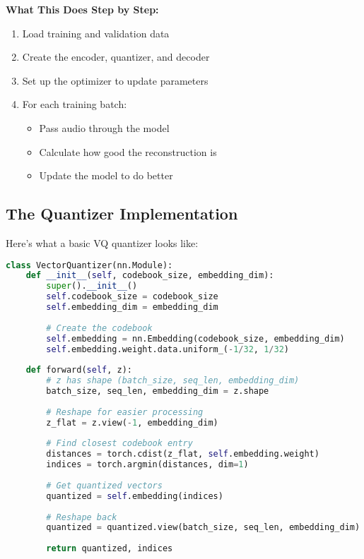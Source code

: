 \documentclass[12pt]{article}
\begin{document}
\textbf{What This Does Step by Step:}
\begin{enumerate}
    \item Load training and validation data
    \item Create the encoder, quantizer, and decoder
    \item Set up the optimizer to update parameters
    \item For each training batch:
    \begin{itemize}
        \item Pass audio through the model
        \item Calculate how good the reconstruction is
        \item Update the model to do better
    \end{itemize}
\end{enumerate}

\subsection{The Quantizer Implementation}

Here's what a basic VQ quantizer looks like:

\begin{lstlisting}[language=Python, basicstyle=\small]
class VectorQuantizer(nn.Module):
    def __init__(self, codebook_size, embedding_dim):
        super().__init__()
        self.codebook_size = codebook_size
        self.embedding_dim = embedding_dim
        
        # Create the codebook
        self.embedding = nn.Embedding(codebook_size, embedding_dim)
        self.embedding.weight.data.uniform_(-1/32, 1/32)
    
    def forward(self, z):
        # z has shape (batch_size, seq_len, embedding_dim)
        batch_size, seq_len, embedding_dim = z.shape
        
        # Reshape for easier processing
        z_flat = z.view(-1, embedding_dim)
        
        # Find closest codebook entry
        distances = torch.cdist(z_flat, self.embedding.weight)
        indices = torch.argmin(distances, dim=1)
        
        # Get quantized vectors
        quantized = self.embedding(indices)
        
        # Reshape back
        quantized = quantized.view(batch_size, seq_len, embedding_dim)
        
        return quantized, indices
\end{lstlisting}
\end{document}
